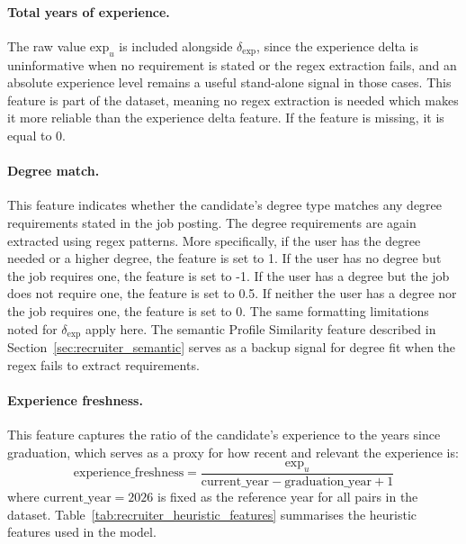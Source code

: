 \paragraph{Total years of experience.} The raw value $\text{exp}_u$ is included alongside $\delta_{\text{exp}}$, since the experience delta is uninformative when no requirement is stated or the regex extraction fails, and an absolute experience level remains a useful stand-alone signal in those cases. This feature is part of the dataset, meaning no regex extraction is needed which makes it more reliable than the experience delta feature. If the feature is missing, it is equal to 0.

\paragraph{Degree match.} This feature indicates whether the candidate's degree type matches any degree requirements stated in the job posting. The degree requirements are again extracted using regex patterns. More specifically, if the user has the degree needed or a higher degree, the feature is set to 1. If the user has no degree but the job requires one, the feature is set to -1. If the user has a degree but the job does not require one, the feature is set to 0.5. If neither the user has a degree nor the job requires one, the feature is set to 0. The same formatting limitations noted for $\delta_{\text{exp}}$ 
apply here. The semantic Profile Similarity feature described in Section~\ref{sec:recruiter_semantic} serves as a backup signal for degree fit when the regex fails to extract requirements.

\paragraph{Experience freshness.} This feature captures the ratio of the candidate's experience to the years since graduation, which serves as a proxy for how recent and relevant the experience is:
\begin{equation}
    \text{experience\_freshness} = \frac{\text{exp}_u}{\text{current\_year} - \text{graduation\_year} + 1}
\end{equation}
where $\text{current\_year} = 2026$ is fixed as the reference year 
for all pairs in the dataset. Table~\ref{tab:recruiter_heuristic_features} summarises the heuristic features used in the model.

